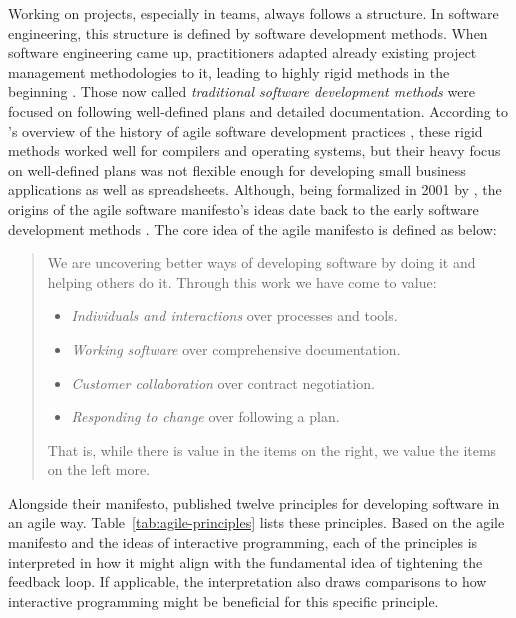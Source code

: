 Working on projects, especially in teams, always follows a structure.
In software engineering, this structure is defined by software development methods.
When software engineering came up, practitioners adapted already existing project management methodologies to it, leading to highly rigid methods in the beginning \cite{misra_agile_2012}.
Those now called \emph{traditional software development methods} were focused on following well-defined plans and detailed documentation.
According to \citeauthor{misra_agile_2012}'s overview of the history of agile software development practices \cite{misra_agile_2012}, these rigid methods worked well for compilers and operating systems, but their heavy focus on well-defined plans was not flexible enough for developing small business applications as well as spreadsheets.
Although, being formalized in 2001 by \citeauthor{beck_manifesto_2001}, the origins of the agile software manifesto's ideas \cite{beck_manifesto_2001} date back to the early software development methods \cite{van_der_aalst_historical_2008}.
The core idea of the agile manifesto is defined as below:
%
\begin{quote}
    We are uncovering better ways of developing software by doing it and helping others do it.
    Through this work we have come to value:
    \begin{itemize}
        \item \emph{Individuals and interactions} over processes and tools.
        \item \emph{Working software} over comprehensive documentation.
        \item \emph{Customer collaboration} over contract negotiation.
        \item \emph{Responding to change} over following a plan.
    \end{itemize}
    That is, while there is value in the items on the right, we value the items on the left more.
\end{quote}
%

Alongside their manifesto, \citeauthor{beck_manifesto_2001} published twelve principles for developing software in an agile way.
Table~\ref{tab:agile-principles} lists these principles.
Based on the agile manifesto and the ideas of interactive programming, each of the principles is interpreted in how it might align with the fundamental idea of tightening the feedback loop.
If applicable, the interpretation also draws comparisons to how interactive programming might be beneficial for this specific principle.

